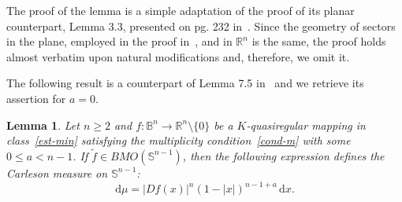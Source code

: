 \documentclass[11pt,a4paper,reqno]{amsart}
\newtheorem{lem}[theorem]{Lemma}
\theoremstyle{definition}
\newcommand{\B}{\mathbb{B}^n}
\newcommand{\Rn}{{\mathbb R}^n}
\newcommand{\ud}{\mathrm {d}}
\newcommand{\Sn}{\mathbb{S}^{n-1}}
\numberwithin{komcounter}{section}
\begin{document}
The proof of the lemma is a simple adaptation of the proof of its planar counterpart, Lemma 3.3, presented on pg. 232 in~\cite[Ch VI]{g}. Since the geometry of sectors in the plane, employed in the proof in~\cite{g}, and in $\Rn$ is the same, the proof holds almost verbatim upon natural modifications and, therefore, we omit it.

The following result is a counterpart of Lemma 7.5 in~\cite{ak} and we retrieve its assertion for $a=0$.

\begin{lem}\label{lem75}
 Let $n \geq 2$ and $f:\B\to \Rn \setminus \{0\}$ be a $K$-quasiregular mapping in class~\eqref{est-min} satisfying the multiplicity condition~\eqref{cond-m} with some $0\leq a<n-1$. If $\tilde{f} \in BMO(\Sn)$, then the following expression defines the Carleson measure on $\Sn$:
 \[
  \ud \mu= |Df(x)|^{n}(1-|x|)^{n-1+a}\,\ud x.
 \]
\end{lem}
\end{document}
